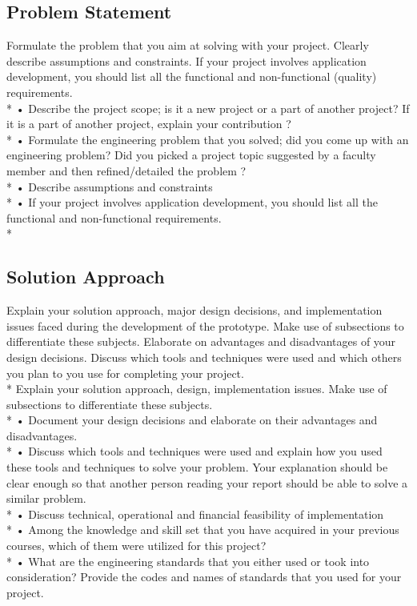 \documentclass{article}
\begin{document}
\begin{center}
    \section{Problem Statement}
\end{center}
Formulate the problem that you aim at solving with your project. Clearly describe assumptions and constraints. If your project involves application development, you should list all the functional and non-functional (quality) requirements.\vspace{0.1cm} \\*
• Describe the project scope; is it a new project or a part of another project? If it is a part of another project, explain your contribution ? \\*
• Formulate the engineering problem that you solved; did you come up with an engineering problem? Did you picked a project topic suggested by a faculty member and then refined/detailed the problem ? \\*
• Describe assumptions and constraints \\*
• If your project involves application development, you should list all the functional and non-functional requirements.\\*

\begin{center}
    \section{Solution Approach}
\end{center}
Explain your solution approach, major design decisions, and implementation issues faced during the development of the prototype. Make use of subsections to differentiate these subjects. Elaborate on advantages and disadvantages of your design decisions. Discuss which tools and techniques were used and which others you plan to you use for completing your project. \vspace{0.1cm}\\*
Explain your solution approach, design, implementation issues. Make use of subsections to differentiate these subjects.\vspace{0.1cm}\\*
• Document your design decisions and elaborate on their advantages and disadvantages.\\*
• Discuss which tools and techniques were used and explain how you used these tools and techniques to solve your problem. Your explanation should be clear enough so that another person reading your report should be able to solve a similar problem.\\*
• Discuss technical, operational and financial feasibility of implementation\\*
• Among the knowledge and skill set that you have acquired in your previous courses, which of them were utilized for this project?\\*
• What are the engineering standards that you either used or took into consideration? Provide the codes and names of standards that you used for your project.
\end{document}
